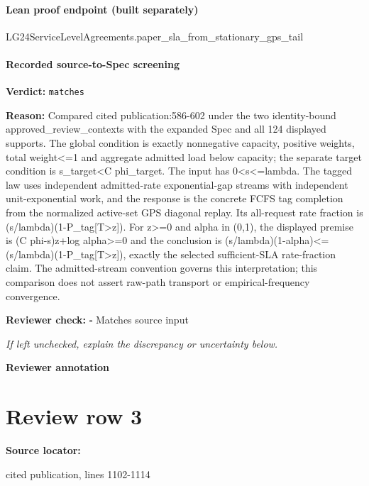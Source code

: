 \documentclass[10pt]{article}
\newcommand{\reviewerbox}{%
  \par\noindent\fbox{\parbox{0.96\linewidth}{\rule{0pt}{0.38in}}}\par
}
\newcommand{\reviewmatch}[1]{%
  \par\noindent\textbf{Reviewer check:} $\square$\; #1\par
  \noindent\emph{If left unchecked, explain the discrepancy or uncertainty below.}\par
}
\begin{document}
\paragraph{Lean proof endpoint (built separately)}\begin{ReviewVerbatim}
LG24ServiceLevelAgreements.paper_sla_from_stationary_gps_tail
\end{ReviewVerbatim}

\paragraph{Recorded source-to-Spec screening}
\textbf{Verdict:} \texttt{matches}
\\
{\raggedright
\textbf{Reason:} Compared cited publication:\allowbreak{}586-\allowbreak{}602 under the two identity-\allowbreak{}bound approved\_\allowbreak{}review\_\allowbreak{}contexts with the expanded Spec and all 124 displayed supports.\allowbreak{} The global condition is exactly nonnegative capacity, positive weights, total weight<=1 and aggregate admitted load below capacity;\allowbreak{} the separate target condition is s\_\allowbreak{}target<C phi\_\allowbreak{}target.\allowbreak{} The input has 0<s<=lambda.\allowbreak{} The tagged law uses independent admitted-\allowbreak{}rate exponential-\allowbreak{}gap streams with independent unit-\allowbreak{}exponential work, and the response is the concrete FCFS tag completion from the normalized active-\allowbreak{}set GPS diagonal replay.\allowbreak{} Its all-\allowbreak{}request rate fraction is (s/\allowbreak{}lambda)(1-\allowbreak{}P\_\allowbreak{}tag[T>z]).\allowbreak{} For z>=0 and alpha in (0,1), the displayed premise is (C phi-\allowbreak{}s)z+log alpha>=0 and the conclusion is (s/\allowbreak{}lambda)(1-\allowbreak{}alpha)<=(s/\allowbreak{}lambda)(1-\allowbreak{}P\_\allowbreak{}tag[T>z]), exactly the selected sufficient-\allowbreak{}SLA rate-\allowbreak{}fraction claim.\allowbreak{} The admitted-\allowbreak{}stream convention governs this interpretation;\allowbreak{} this comparison does not assert raw-\allowbreak{}path transport or empirical-\allowbreak{}frequency convergence.\allowbreak{}
\par}
\reviewmatch{Matches source input}
\noindent\textbf{Reviewer annotation}\par
\reviewerbox
\clearpage
\hypertarget{source-claim-bf99f8f0a864f021}{}
\section*{Review row 3}
\textbf{Source locator:} {\footnotesize\raggedright cited publication, lines 1102-\allowbreak{}1114\par}
\end{document}
